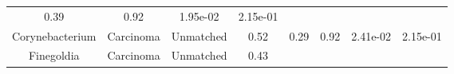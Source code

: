 \documentclass[12pt,]{article}
\begin{document}
\begin{longtable}[]{@{}cccccccc@{}}
\begin{minipage}[t]{0.13\columnwidth}
0.39\strut
\end{minipage} & \begin{minipage}[t]{0.13\columnwidth}\centering\strut
0.92\strut
\end{minipage} & \begin{minipage}[t]{0.07\columnwidth}\centering\strut
1.95e-02\strut
\end{minipage} & \begin{minipage}[t]{0.07\columnwidth}\centering\strut
2.15e-01\strut
\end{minipage}\tabularnewline
\begin{minipage}[t]{0.16\columnwidth}\centering\strut
Corynebacterium\strut
\end{minipage} & \begin{minipage}[t]{0.08\columnwidth}\centering\strut
Carcinoma\strut
\end{minipage} & \begin{minipage}[t]{0.09\columnwidth}\centering\strut
Unmatched\strut
\end{minipage} & \begin{minipage}[t]{0.05\columnwidth}\centering\strut
0.52\strut
\end{minipage} & \begin{minipage}[t]{0.13\columnwidth}\centering\strut
0.29\strut
\end{minipage} & \begin{minipage}[t]{0.13\columnwidth}\centering\strut
0.92\strut
\end{minipage} & \begin{minipage}[t]{0.07\columnwidth}\centering\strut
2.41e-02\strut
\end{minipage} & \begin{minipage}[t]{0.07\columnwidth}\centering\strut
2.15e-01\strut
\end{minipage}\tabularnewline
\begin{minipage}[t]{0.16\columnwidth}\centering\strut
Finegoldia\strut
\end{minipage} & \begin{minipage}[t]{0.08\columnwidth}\centering\strut
Carcinoma\strut
\end{minipage} & \begin{minipage}[t]{0.09\columnwidth}\centering\strut
Unmatched\strut
\end{minipage} & \begin{minipage}[t]{0.05\columnwidth}\centering\strut
0.43\strut
\end{minipage} & \begin{minipage}[t]{0.13\columnwidth}\centering\strut

\end{minipage}
\end{longtable}
\end{document}
